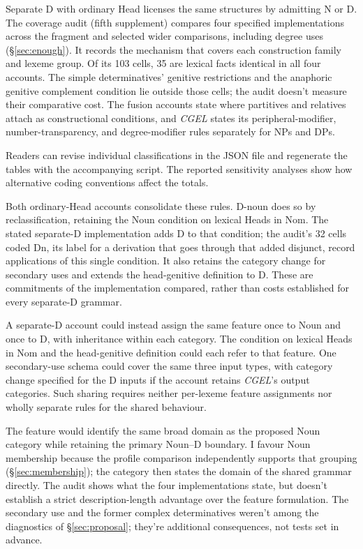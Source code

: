 \documentclass[12pt]{article}
\begin{document}
Separate D with ordinary Head licenses the same structures by admitting N or D. The coverage audit (fifth supplement) compares four specified implementations across the fragment and selected wider comparisons, including degree uses (§\ref{sec:enough}). It records the mechanism that covers each construction family and lexeme group. Of its 103 cells, 35 are lexical facts identical in all four accounts. The simple determinatives' genitive restrictions and the anaphoric genitive complement condition lie outside those cells; the audit doesn't measure their comparative cost. The fusion accounts state where partitives and relatives attach as constructional conditions, and \textit{CGEL} states its peripheral-modifier, number-transparency, and degree-modifier rules separately for NPs and DPs.

Readers can revise individual classifications in the JSON file and regenerate the tables with the accompanying script. The reported sensitivity analyses show how alternative coding conventions affect the totals.

Both ordinary-Head accounts consolidate these rules. D-noun does so by reclassification, retaining the Noun condition on lexical Heads in Nom. The stated separate-D implementation adds D to that condition; the audit's 32 cells coded Dn, its label for a derivation that goes through that added disjunct, record applications of this single condition. It also retains the category change for secondary uses and extends the head-genitive definition to D. These are commitments of the implementation compared, rather than costs established for every separate-D grammar.

A separate-D account could instead assign the same feature once to Noun and once to D, with inheritance within each category. The condition on lexical Heads in Nom and the head-genitive definition could each refer to that feature. One secondary-use schema could cover the same three input types, with category change specified for the D inputs if the account retains \textit{CGEL}'s output categories. Such sharing requires neither per-lexeme feature assignments nor wholly separate rules for the shared behaviour.

The feature would identify the same broad domain as the proposed Noun category while retaining the primary Noun--D boundary. I favour Noun membership because the profile comparison independently supports that grouping (§\ref{sec:membership}); the category then states the domain of the shared grammar directly. The audit shows what the four implementations state, but doesn't establish a strict description-length advantage over the feature formulation. The secondary use and the former complex determinatives weren't among the diagnostics of §\ref{sec:proposal}; they're additional consequences, not tests set in advance.
\end{document}

